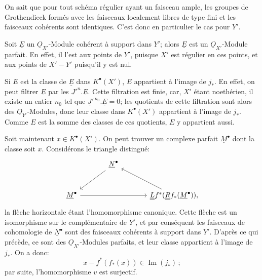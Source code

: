 
On
sait que pour tout schéma régulier ayant un faisceau ample, les groupes de Grothendieck formés avec les faisceaux localement libres de type fini et les faisceaux cohérents sont identiques. C'est donc en particulier le cas pour \(Y'\).

Soit \(\underline{E}\) un \(\underline{O}_{X'}\)-Module cohérent à support dans \(Y'\); alors \(\underline{E}\) est un \(\underline{O}_{X'}\)-Module parfait. En effet, il l'est aux points de \(Y'\), puisque \(X'\) est régulier en ces points, et aux points de \(X'-Y'\) puisqu'il y est nul.

Si \(E\) est la classe de \(\underline{E}\) dans \(K^{\bullet}(X')\), \(E\) appartient à l'image de \(j_*\). En effet, on peut filtrer \(\underline{E}\) par les \(\underline{J}'^n.\underline{E}\). Cette filtration est finie, car, \(X'\) étant noethérien, il existe un entier \(n_0\) tel que \(\underline{J}'^{\,n_0}.\underline{E}=0\); les quotients de cette filtration sont alors des \(\underline{O}_{Y'}\)-Modules, donc leur classe dans \(K^{\bullet}(X')\) appartient à l'image de \(j_*\). Comme \(E\) est la somme des classes de ces quotients, \(E\) y appartient aussi.

Soit maintenant \(x\in K^{\bullet}(X')\). On peut trouver un complexe parfait \(\underline{M}^\bullet\) dont la classe soit \(x\). Considérons le triangle distingué:
\[
\begin{tikzcd}[column sep=large,row sep=large]
& \underline{N}^\bullet \arrow[dl] &\\
\underline{M}^\bullet \arrow[rr] && \underline{\underline{L}}f^*(\underline{\underline{R}}f_*(\underline{M}^\bullet)) \arrow[ul] ,
\end{tikzcd}
\]
la flèche horizontale étant l'homomorphisme canonique. Cette flèche est un isomorphisme sur le complémentaire de \(Y'\), et par conséquent les faisceaux de cohomologie de \(\underline{N}^\bullet\) sont des faisceaux cohérents à support dans \(Y'\). D'après ce qui précède, ce sont des \(\underline{O}_{X'}\)-Modules parfaits, et leur classe appartient à l'image de \(j_*\). On a donc:
\[
x-f^*(f_*(x))\in\operatorname{Im}(j_*)\,;
\]
par suite, l'homomorphisme \(v\) est surjectif.



\providecommand{\Q}{\mathbb Q}
\providecommand{\bfP}{\mathbf P}
\providecommand{\gr}{\operatorname{gr}}
\providecommand{\Id}{\operatorname{Id}}
\providecommand{\Fil}{\operatorname{Fil}}
\providecommand{\Imf}{\operatorname{Im}}
\providecommand{\rank}{\operatorname{rank}}
\providecommand{\codim}{\operatorname{codim}}
\providecommand{\cJ}{\mathcal J}
\providecommand{\cI}{\mathcal I}
\providecommand{\cN}{\mathcal N}
\providecommand{\cE}{\mathcal E}
\providecommand{\cO}{\mathcal O}


